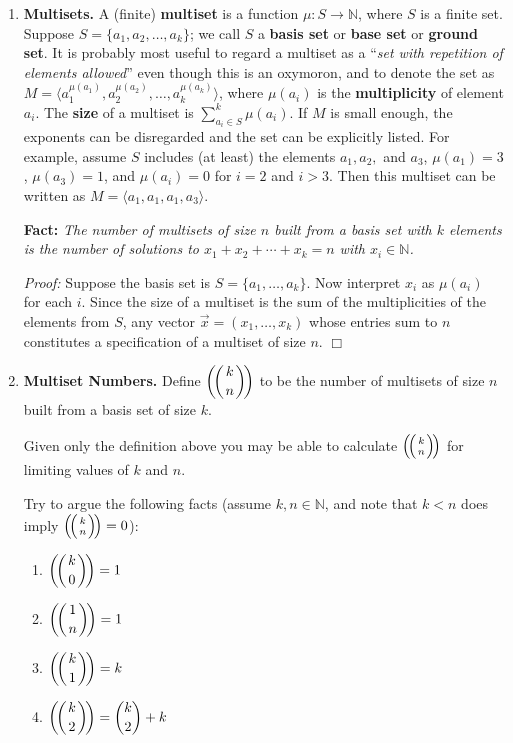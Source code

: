 \documentclass[10pt, AMS Euler]{article}
\newcommand{\ds}{\displaystyle}
\newcommand{\N}{\mathbb{N}}
\begin{document}
\begin{enumerate}
\item{\bf Multisets.}  A (finite) {\bf multiset} is a function $\mu:S \to \N$, where $S$ is a finite set.
Suppose $S = \{a_1, a_2, \dots, a_k\}$; we call $S$ a {\bf basis set} or {\bf base set} or {\bf ground set}.
It is probably most useful to regard a multiset as a ``\emph{set with repetition of elements allowed}'' even though this is an oxymoron,
and to denote the set as $M = \langle a_1^{\mu(a_1)}, a_2^{\mu(a_2)}, \dots, a_k^{\mu(a_k)}\rangle$,
where $\mu(a_i)$ is the {\bf multiplicity} of element $a_i$. The {\bf size} of a multiset is $\sum_{a_i \in S}^k\mu(a_i)$.
If $M$ is small enough, the exponents can be disregarded and the
set can be explicitly listed.
For example, assume  $S$ includes (at least) the elements $a_1,a_2,$ and $a_3$, $\mu(a_1) = 3$, $\mu(a_3) = 1$, and $\mu(a_i) = 0$ for $i =2$ and $i > 3$.
Then this multiset can be written as $M = \langle a_1,a_1, a_1, a_3\rangle$.


{\bf Fact:} \emph{The number of multisets of size $n$ built from a basis set with $k$ elements is the number of
solutions to $x_1 + x_2 + \cdots + x_k = n$ with $x_i \in \N$.}

\emph{Proof:} Suppose the basis set is $S = \{a_1, \dots, a_k\}$.  Now interpret $x_i$ as $\mu(a_i)$ for each $i$.
Since the size of a multiset is the sum of the multiplicities of the elements from $S$, any vector
$\vec{x} = (x_1, \dots, x_k)$ whose entries sum to $n$ constitutes a specification of a multiset of size $n$. \hfill $\Box$

\item{\bf Multiset Numbers.}  Define $\ds\left(\!\left(k \atop n \right)\!\right)$ to be the number of 
multisets of size $n$ built from a basis set of size $k$.

Given only the definition above you may be able to calculate $\left( \!\left(k \atop n\right)\! \right)$ for limiting values of $k$ and $n$.

Try to argue the following facts (assume $k,n \in \N$, and note that $k < n$ does imply $\left(\!\left(k \atop n \right)\!\right) = 0$):
\begin{enumerate}
\item $\ds\left(\!\left(k \atop 0 \right)\!\right)  = 1$
\item $\ds\left(\!\left(1 \atop n \right)\!\right) = 1$
\item $\ds\left(\!\left(k \atop 1 \right)\!\right) = k$
\item $\ds\left(\!\left(k \atop 2 \right)\!\right) = \binom{k}{2} + k$
\end{enumerate}


\end{enumerate}
\end{document}
